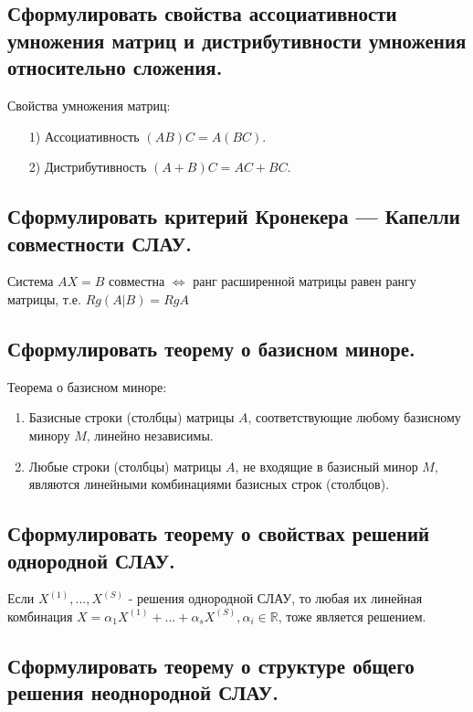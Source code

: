 \subsection{Сформулировать свойства ассоциативности умножения матриц и дистрибутивности умножения относительно сложения.}

\noindent
Свойства умножения матриц:
\begin{enumerate}
    \item[1)] Ассоциативность $(AB)C = A(BC)$.
    \item[2)] Дистрибутивность $(A + B)C = AC + BC$.
\end{enumerate}

\subsection{Сформулировать критерий Кронекера — Капелли совместности СЛАУ.}

Система $AX = B$ совместна $\iff$ ранг расширенной матрицы равен рангу матрицы, т.е. $Rg(A|B)=RgA$

\subsection{Сформулировать теорему о базисном миноре.}

Теорема о базисном миноре:
\begin{enumerate}
    \item Базисные строки (столбцы) матрицы $A$, соответствующие любому базисному минору $M$, линейно независимы.
    \item Любые строки (столбцы) матрицы $A$, не входящие в базисный минор $M$, являются линейными комбинациями базисных строк (столбцов).
\end{enumerate}

\subsection{Сформулировать теорему о свойствах решений однородной СЛАУ.}

Если $X^{(1)}, ..., X^{(S)}$ - решения однородной СЛАУ, то любая их линейная комбинация $X = \alpha_1X^{(1)}+ ...+ \alpha_sX^{(S)}, \alpha_i\in\mathbb{R}$, тоже является решением.

\subsection{Сформулировать теорему о структуре общего решения неоднородной СЛАУ.}

